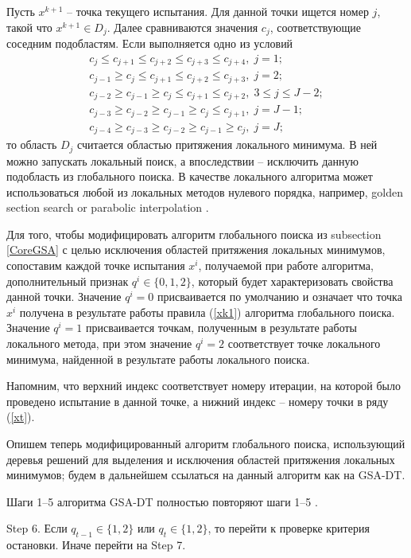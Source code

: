 \documentclass[entropy,article,submit,moreauthors,pdftex]{Definitions/mdpi}
\begin{document}
Пусть $x^{k+1}$ -- точка текущего испытания. Для данной точки ищется номер $j$, такой что $x^{k+1} \in D_j$. 
Далее сравниваются значения $c_j$, соответствующие соседним подобластям. Если выполняется одно из условий
\begin{gather}\label{LocalPointC}
c_{j} \leq c_{j+1} \leq c_{j+2} \leq c_{j+3} \leq c_{j+4}, \; j=1; \nonumber \\ 
c_{j-1} \geq c_{j} \leq c_{j+1} \leq c_{j+2} \leq c_{j+3}, \; j=2;  \nonumber \\  
c_{j-2} \geq c_{j-1} \geq c_{j} \leq c_{j+1} \leq c_{j+2}, \; 3 \leq j \leq J-2; \\ 
c_{j-3} \geq c_{j-2} \geq c_{j-1} \geq c_{j} \leq c_{j+1}, \; j=J-1; \nonumber \\ 
c_{j-4} \geq c_{j-3} \geq c_{j-2} \geq c_{j-1} \geq c_{j}, \; j=J; \nonumber 
\end{gather}
то область $D_j$ считается областью притяжения локального минимума. В ней можно запускать локальный поиск, а впоследствии -- исключить данную подобласть из глобального поиска.
В качестве локального алгоритма может использоваться любой из локальных методов нулевого порядка, например,  golden section search or parabolic interpolation \cite{Press}.

Для того, чтобы модифицировать алгоритм глобального поиска из subsection \ref{CoreGSA} с целью исключения областей притяжения локальных минимумов, сопоставим каждой точке испытания $x^i$, получаемой при работе алгоритма, дополнительный признак $q^i \in \{0,1,2\}$, который будет характеризовать свойства данной точки. 
Значение $q^i=0$ присваивается по умолчанию и означает что точка $x^i$ получена в результате работы правила (\ref{xk1}) алгоритма глобального поиска.
Значение $q^i=1$ присваивается точкам, полученным в результате работы локального метода, при этом значение $q^i=2$ соответствует точке локального минимума, найденной в результате работы локального поиска. 

Напомним, что верхний индекс соответствует номеру итерации, на которой было проведено испытание в данной точке, а нижний индекс -- номеру точки в ряду (\ref{xt}).

Опишем теперь модифицированный алгоритм глобального поиска, использующий деревья решений для выделения и исключения областей притяжения локальных минимумов; будем в дальнейшем ссылаться на данный алгоритм как на GSA-DT.

Шаги 1--5 алгоритма GSA-DT полностью повторяют шаги 1--5 . 

Step 6. Если $q_{t-1} \in \{1,2\}$ или $q_t \in \{1,2\}$, то перейти к проверке критерия остановки. Иначе перейти на Step 7.
\end{document}
